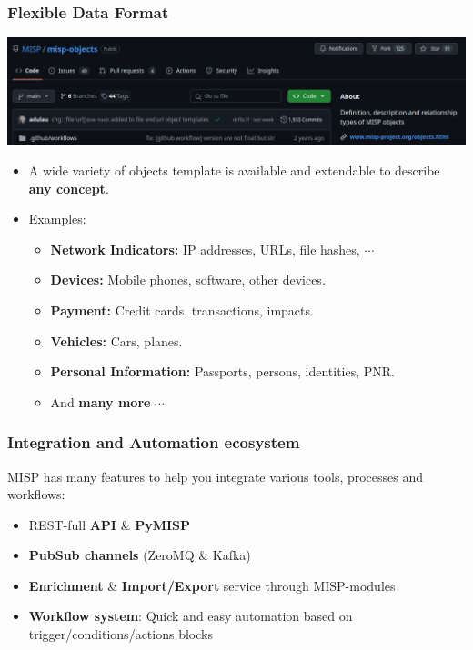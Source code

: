 \begin{frame}
    \frametitle{Flexible Data Format}
    \begin{center}
        \includegraphics[width=0.84\linewidth]{misp-objects-repo.png}
    \end{center}
    \begin{itemize}
        \item A wide variety of objects template is available and extendable to describe \textbf{any concept}.
        \item Examples:
        \begin{itemize}
            \item \textbf{Network Indicators:} IP addresses, URLs, file hashes, $\cdots$
            \item \textbf{Devices:} Mobile phones, software, other devices.
            \item \textbf{Payment:} Credit cards, transactions, impacts.
            \item \textbf{Vehicles:} Cars, planes.
            \item \textbf{Personal Information:} Passports, persons, identities, PNR.
            \item And \textbf{many more} $\cdots$
        \end{itemize}
    \end{itemize}
\end{frame}

\begin{frame}
    \frametitle{Integration and Automation ecosystem}
    MISP has many features to help you integrate various tools, processes and workflows:
    \begin{itemize}
        \item REST-full \textbf{API} \& \textbf{PyMISP}
        \item \textbf{PubSub channels} (ZeroMQ \& Kafka)
        \item \textbf{Enrichment} \& \textbf{Import/Export} service through MISP-modules
        \item \textbf{Workflow system}: Quick and easy automation based on trigger/conditions/actions blocks
    \end{itemize}
\end{frame}

